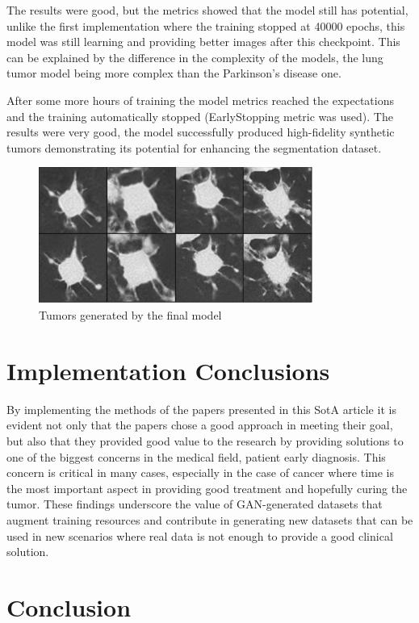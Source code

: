 \documentclass[12pt]{article}
\begin{document}
The results were good, but the metrics showed that the model still has potential, unlike the first implementation where the training stopped at 40000 epochs, this model was still learning and providing better images after this checkpoint.
This can be explained by the difference in the complexity of the models, the lung tumor model being more complex than the Parkinson's disease one.

After some more hours of training the model metrics reached the expectations and the training automatically stopped (EarlyStopping metric was used). 
The results were very good, the model successfully produced high-fidelity synthetic tumors demonstrating its potential for enhancing the segmentation dataset.

\begin{figure}[h]
\includegraphics[width=9cm]{generatedTumorsFinal.png}
\centering
\caption{Tumors generated by the final model}
\end{figure}


\section{Implementation Conclusions}

By implementing the methods of the papers presented in this SotA article it is evident not only that the papers chose a good approach in meeting their goal, but also that they provided good value to the research by providing solutions to one of the biggest concerns in the medical field, patient early diagnosis. This concern is critical in many cases, especially in the case of cancer where time is the most important aspect in providing good treatment and hopefully curing the tumor. These findings underscore the value of GAN-generated datasets that augment training resources and contribute in generating new datasets that can be used in new scenarios where real data is not enough to provide a good clinical solution.


\section{Conclusion}
\end{document}
